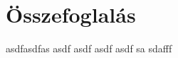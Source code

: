 \documentclass[../documentation.tex]{subfiles}
\begin{document}
\section{Összefoglalás}
asdfasdfas asdf asdf asdf asdf sa sdafff
\end{document}
